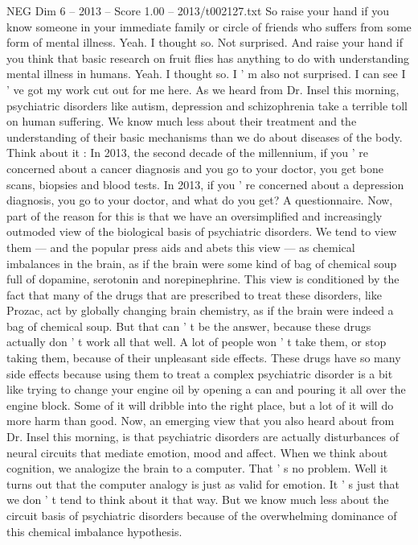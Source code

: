 \begin{textsample}{NEG Dim 6 – 2013 – Score 1.00 – 2013/t002127.txt}  \label{ex:f6_neg_044}
So raise your hand if you know someone in your immediate family or circle of friends who suffers from some form of mental illness.
Yeah.
I thought so.
Not surprised.
And raise your hand if you think that basic research on fruit flies has anything to do with understanding mental illness in humans.
Yeah.
I thought so.
I ' m also not surprised.
I can see I ' ve got my work cut out for me here.
As we heard from Dr.
Insel this morning, psychiatric disorders like autism, depression and schizophrenia take a terrible toll on human suffering.
We know much less about their treatment and the understanding of their basic mechanisms than we do about diseases of the body.
Think about it : In 2013, the second decade of the millennium, if you ' re concerned about a cancer diagnosis and you go to your doctor, you get bone scans, biopsies and blood tests.
In 2013, if you ' re concerned about a depression diagnosis, you go to your doctor, and what do you get?
A questionnaire.
Now, part of the reason for this is that we have an oversimplified and increasingly outmoded view of the biological basis of psychiatric disorders.
We tend to view them — and the popular press aids and abets this view — as chemical imbalances in the brain, as if the brain were some kind of bag of chemical soup full of dopamine, serotonin and norepinephrine.
This view is conditioned by the fact that many of the drugs that are prescribed to treat these disorders, like Prozac, act by globally changing brain chemistry, as if the brain were indeed a bag of chemical soup.
But that can ' t be the answer, because these drugs actually don ' t work all that well.
A lot of people won ' t take them, or stop taking them, because of their unpleasant side effects.
These drugs have so many side effects because using them to treat a complex psychiatric disorder is a bit like trying to change your engine oil by opening a can and pouring it all over the engine block.
Some of it will dribble into the right place, but a lot of it will do more harm than good.
Now, an emerging view that you also heard about from Dr.
Insel this morning, is that psychiatric disorders are actually disturbances of neural circuits that mediate emotion, mood and affect.
When we think about cognition, we analogize the brain to a computer.
That ' s no problem.
Well it turns out that the computer analogy is just as valid for emotion.
It ' s just that we don ' t tend to think about it that way.
But we know much less about the circuit basis of psychiatric disorders because of the overwhelming dominance of this chemical imbalance hypothesis.

\end{textsample}
